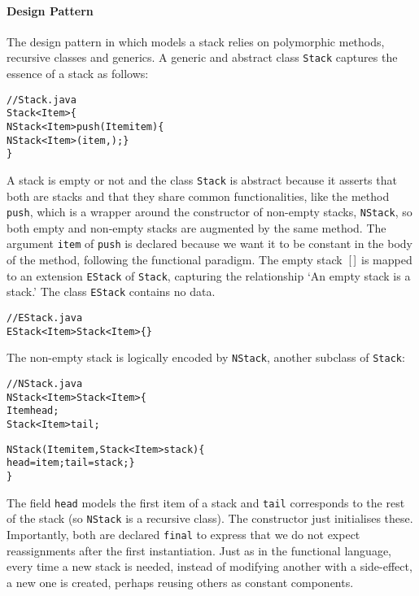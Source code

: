 \paragraph{Design Pattern}

The design pattern in \Java which models a stack  relies on polymorphic methods, recursive classes and
generics. A generic and abstract class \texttt{Stack} captures the
essence of a stack as follows:
\begin{alltt}
// Stack.java
\public \abstractX \class Stack<Item> \{
  \public \final NStack<Item> push(\final Item item) \{
    \return \new NStack<Item>(item,\this); \}
\}
\end{alltt}
A stack is empty or not and the class \texttt{Stack} is abstract
because it asserts that both are stacks and that they share common
functionalities, like the method \texttt{push}, which is a wrapper
around the constructor of non\hyp{}empty stacks, \texttt{NStack}, so
both empty and non\hyp{}empty stacks are augmented by the same
method. The argument \texttt{item} of \texttt{push} is declared
\final{} because we want it to be constant in the body of the method,
following the functional paradigm. The empty stack~\([\,]\) is mapped
to an extension \texttt{EStack} of \texttt{Stack}, capturing the
relationship `An empty stack is a stack.' The class \texttt{EStack}
contains no data.
\begin{alltt}
// EStack.java
\public \final \class EStack<Item> \extends Stack<Item> \{\}
\end{alltt}
The non\hyp{}empty stack is logically encoded by \texttt{NStack},
another subclass of \texttt{Stack}:
\begin{alltt}
// NStack.java
\public \final \class NStack<Item> \extends Stack<Item> \{
  \private \final Item head;
  \private \final Stack<Item> tail;

  \public NStack(\final Item item, \final Stack<Item> stack) \{
    head = item; tail = stack; \}
\}
\end{alltt}
The field \texttt{head} models the first item of a stack and
\texttt{tail} corresponds to the rest of the stack (so \texttt{NStack}
is a recursive class). The constructor just initialises
these. Importantly, both are declared \texttt{final} to express that
we do not expect reassignments after the first instantiation. Just as
in the functional language, every time a new stack is needed, instead
of modifying another with a side\hyp{}effect, a new one is created,
perhaps reusing others as constant components.

